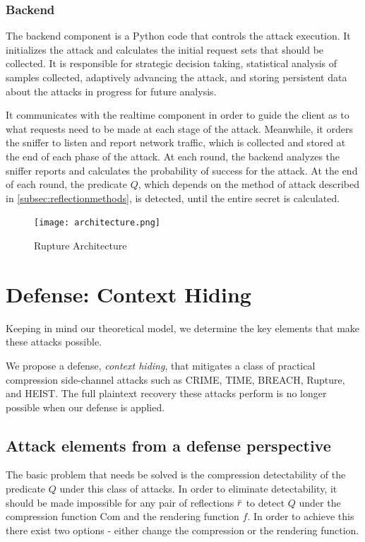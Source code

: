 \documentclass[conference, letterpaper, 10pt]{IEEEtran}
\newcommand{\overbar}[1]{\mkern 1.5mu\overline{\mkern-1.5mu#1\mkern-1.5mu}\mkern 1.5mu}
\begin{document}
\subsubsection{Backend}

The backend component is a Python code that controls the attack execution. It
initializes the attack and calculates the initial request sets that should be
collected. It is responsible for strategic decision taking, statistical
analysis of samples collected, adaptively advancing the attack, and storing
persistent data about the attacks in progress for future analysis.

It communicates with the realtime component in order to guide the client as to
what requests need to be made at each stage of the attack. Meanwhile, it orders
the sniffer to listen and report network traffic, which is collected and stored
at the end of each phase of the attack. At each round, the backend analyzes the
sniffer reports and calculates the probability of success for the attack. At the
end of each round, the predicate $Q$, which depends on the method of attack described
in \ref{subsec:reflectionmethods}, is detected, until the entire secret is
calculated.

   \begin{figure}[thpb]
      \centering
          \texttt{[image: architecture.png]}
      \caption{Rupture Architecture}
   \end{figure}

\section{Defense: Context Hiding}\label{sec:defense}
Keeping in mind our theoretical model, we determine the key elements that make these
attacks possible.

We propose a defense, \textit{context hiding}, that mitigates a class of
practical compression side-channel attacks such as CRIME, TIME, BREACH, Rupture,
and HEIST. The full plaintext recovery these attacks perform is no longer
possible when our defense is applied.

\subsection{Attack elements from a defense perspective}
The basic problem that needs be solved is the compression detectability of
the predicate $Q$ under this class of attacks. In order to eliminate detectability,
it should be made impossible for any pair of reflections $\overbar{r}$ to detect
$Q$ under the compression function $\textrm{Com}$ and the rendering function $f$. In order to
achieve this there exist two options - either change the compression or the
rendering function.
\end{document}
